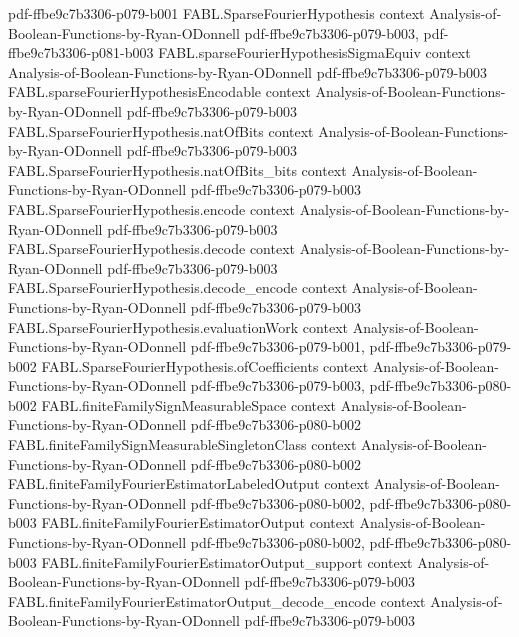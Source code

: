 \begin{theorem}
  {pdf-ffbe9c7b3306-p079-b001}
\proofstep
  {FABL.SparseFourierHypothesis}
  {context}
  {Analysis-of-Boolean-Functions-by-Ryan-ODonnell}
  {pdf-ffbe9c7b3306-p079-b003,
    pdf-ffbe9c7b3306-p081-b003}
\proofstep
  {FABL.sparseFourierHypothesisSigmaEquiv}
  {context}
  {Analysis-of-Boolean-Functions-by-Ryan-ODonnell}
  {pdf-ffbe9c7b3306-p079-b003}
\proofstep
  {FABL.sparseFourierHypothesisEncodable}
  {context}
  {Analysis-of-Boolean-Functions-by-Ryan-ODonnell}
  {pdf-ffbe9c7b3306-p079-b003}
\proofstep
  {FABL.SparseFourierHypothesis.natOfBits}
  {context}
  {Analysis-of-Boolean-Functions-by-Ryan-ODonnell}
  {pdf-ffbe9c7b3306-p079-b003}
\proofstep
  {FABL.SparseFourierHypothesis.natOfBits_bits}
  {context}
  {Analysis-of-Boolean-Functions-by-Ryan-ODonnell}
  {pdf-ffbe9c7b3306-p079-b003}
\proofstep
  {FABL.SparseFourierHypothesis.encode}
  {context}
  {Analysis-of-Boolean-Functions-by-Ryan-ODonnell}
  {pdf-ffbe9c7b3306-p079-b003}
\proofstep
  {FABL.SparseFourierHypothesis.decode}
  {context}
  {Analysis-of-Boolean-Functions-by-Ryan-ODonnell}
  {pdf-ffbe9c7b3306-p079-b003}
\proofstep
  {FABL.SparseFourierHypothesis.decode_encode}
  {context}
  {Analysis-of-Boolean-Functions-by-Ryan-ODonnell}
  {pdf-ffbe9c7b3306-p079-b003}
\proofstep
  {FABL.SparseFourierHypothesis.evaluationWork}
  {context}
  {Analysis-of-Boolean-Functions-by-Ryan-ODonnell}
  {pdf-ffbe9c7b3306-p079-b001,
    pdf-ffbe9c7b3306-p079-b002}
\proofstep
  {FABL.SparseFourierHypothesis.ofCoefficients}
  {context}
  {Analysis-of-Boolean-Functions-by-Ryan-ODonnell}
  {pdf-ffbe9c7b3306-p079-b003,
    pdf-ffbe9c7b3306-p080-b002}
\proofstep
  {FABL.finiteFamilySignMeasurableSpace}
  {context}
  {Analysis-of-Boolean-Functions-by-Ryan-ODonnell}
  {pdf-ffbe9c7b3306-p080-b002}
\proofstep
  {FABL.finiteFamilySignMeasurableSingletonClass}
  {context}
  {Analysis-of-Boolean-Functions-by-Ryan-ODonnell}
  {pdf-ffbe9c7b3306-p080-b002}
\proofstep
  {FABL.finiteFamilyFourierEstimatorLabeledOutput}
  {context}
  {Analysis-of-Boolean-Functions-by-Ryan-ODonnell}
  {pdf-ffbe9c7b3306-p080-b002,
    pdf-ffbe9c7b3306-p080-b003}
\proofstep
  {FABL.finiteFamilyFourierEstimatorOutput}
  {context}
  {Analysis-of-Boolean-Functions-by-Ryan-ODonnell}
  {pdf-ffbe9c7b3306-p080-b002,
    pdf-ffbe9c7b3306-p080-b003}
\proofstep
  {FABL.finiteFamilyFourierEstimatorOutput_support}
  {context}
  {Analysis-of-Boolean-Functions-by-Ryan-ODonnell}
  {pdf-ffbe9c7b3306-p079-b003}
\proofstep
  {FABL.finiteFamilyFourierEstimatorOutput_decode_encode}
  {context}
  {Analysis-of-Boolean-Functions-by-Ryan-ODonnell}
  {pdf-ffbe9c7b3306-p079-b003}
\proofstep

\end{theorem}
